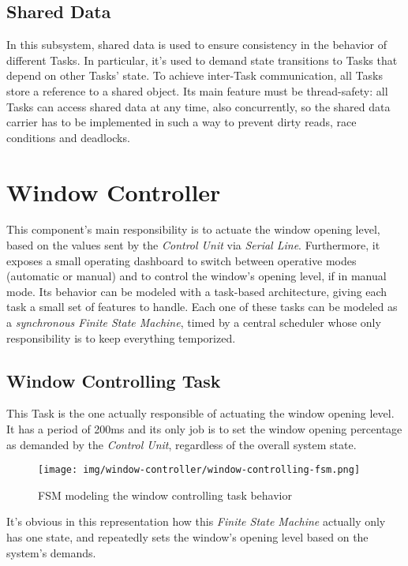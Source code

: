 \documentclass[a4paper,12pt]{report}
\begin{document}
		\subsection{Shared Data}
		In this subsystem, shared data is used to ensure consistency in the behavior of different Tasks. In particular, it's used to demand state transitions to Tasks that depend on other Tasks' state.
		\newline To achieve inter-Task communication, all Tasks store a reference to a shared object. Its main feature must be thread-safety: all Tasks can access shared data at any time, also concurrently, so the shared data carrier has to be implemented in such a way to prevent dirty reads, race conditions and deadlocks.
	\section{Window Controller}
	This component's main responsibility is to actuate the window opening level, based on the values sent by the \textit{Control Unit} via \textit{Serial Line}. Furthermore, it exposes a small operating dashboard to switch between operative modes (automatic or manual) and to control the window's opening level, if in manual mode. Its behavior can be modeled with a task-based architecture, giving each task a small set of features to handle. Each one of these tasks can be modeled as a \textit{synchronous Finite State Machine}, timed by a central scheduler whose only responsibility is to keep everything temporized.
		\subsection{Window Controlling Task}
		This Task is the one actually responsible of actuating the window opening level. It has a period of 200ms and its only job is to set the window opening percentage as demanded by the \textit{Control Unit}, regardless of the overall system state.
		\begin{figure}[H]
			\centering{}
			\texttt{[image: img/window-controller/window-controlling-fsm.png]}
			\caption{FSM modeling the window controlling task behavior}
			\label{img:window-controller/window-controlling-fsm}
		\end{figure}
		It's obvious in this representation how this \textit{Finite State Machine} actually only has one state, and repeatedly sets the window's opening level based on the system's demands.
\end{document}
